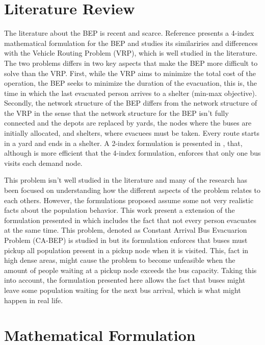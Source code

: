 \documentclass[conference]{IEEEtran}
\begin{document}
\section{Literature Review}

The literature about the BEP is recent and scarce. Reference \cite{b1} presents a 4-index mathematical formulation for the BEP and studies its similariries and differences with the Vehicle Routing Problem (VRP), which is well studied in the literature. The two problems differs in two key aspects that make the BEP more difficult to solve than the VRP. First, while the VRP aims to minimize the total cost of the operation, the BEP seeks to minimize the duration of the evacuation, this is, the time in which the last evacuated person arrives to a shelter (min-max objective). Secondly, the network structure of the BEP differs from the network structure of the VRP in the sense that the network structure for the BEP isn't fully connected and the depots are replaced by yards, the nodes where the buses are initially allocated, and shelters, where evacuees must be taken. Every route starts in a yard and ends in a shelter. A 2-index formulation is presented in \cite{b2}, that, although is more efficient that the 4-index formulation, enforces that only one bus visits each demand node.

This problem isn't well studied in the literature and many of the research has been focused on understanding how the different aspects of the problem relates to each others. However, the formulations proposed assume some not very realistic facts about the population behavior. This work present a extension of the formulation presented in \cite{b1} which includes the fact that not every person evacuates at the same time. This problem, denoted as Constant Arrival Bus Evacuarion Problem (CA-BEP) is studied in \cite{b3} but its formulation enforces that buses must pickup all population present in a pickup node when it is visited. This, fact in high dense areas, might cause the problem to become unfeasible when the amount of people waiting at a pickup node exceeds the bus capacity. Taking this into account, the formulation presented here allows the fact that buses might leave some population waiting for the next bus arrival, which is what might happen in real life.

\section{Mathematical Formulation}
\end{document}
